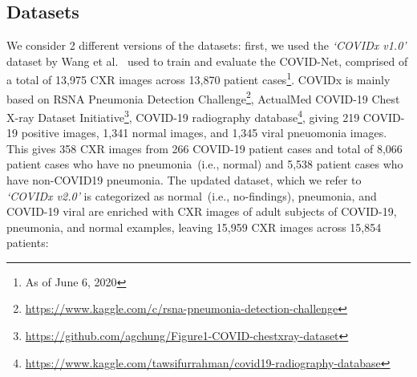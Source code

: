 \documentclass[conference]{IEEEtran}
\begin{document}
\subsection{Datasets}
\label{sec:ds}
We consider 2 different versions of the datasets: first, we used the \emph{`COVIDx v1.0'} dataset by Wang et al.~\cite{wang2020covid} used to train and evaluate the COVID-Net, comprised of a total of 13,975 CXR images across 13,870 patient cases\footnote{As of June 6, 2020}. COVIDx is mainly based on RSNA Pneumonia Detection Challenge\footnote{\url{https://www.kaggle.com/c/rsna-pneumonia-detection-challenge}}, ActualMed COVID-19 Chest X-ray Dataset Initiative\footnote{\url{https://github.com/agchung/Figure1-COVID-chestxray-dataset}}, COVID-19 radiography database\footnote{\url{https://www.kaggle.com/tawsifurrahman/covid19-radiography-database}}, giving 219 COVID-19 positive images, 1,341 normal images, and 1,345 viral pneuomonia images. This gives 358 CXR images from 266 COVID-19 patient cases and total of 8,066 patient cases who have no pneumonia~(i.e., normal) and 5,538 patient cases who have non-COVID19 pneumonia. 
The updated dataset, which we refer to \emph{`COVIDx v2.0'} is categorized as normal~(i.e., no-findings), pneumonia, and COVID-19 viral are enriched with CXR images of adult subjects of COVID-19, pneumonia, and normal examples, leaving 15,959 CXR images across 15,854 patients: 

\end{document}
